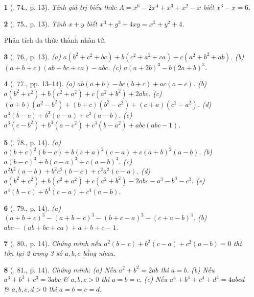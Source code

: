 \documentclass{article}
\newtheorem{baitoan}{}
\begin{document}
\begin{baitoan}[\cite{Binh_Toan_8_tap_1}, 74., p. 13]
	Tính giá trị biểu thức $A = x^6 - 2x^4 + x^3 + x^2 - x$ biết $x^3 - x = 6$.
\end{baitoan}

\begin{baitoan}[\cite{Binh_Toan_8_tap_1}, 75., p. 13]
	Tính $x + y$ biết $x^3 + y^3 + 4xy = x^2 + y^2 + 4$.
\end{baitoan}
Phân tích đa thức thành nhân tử:

\begin{baitoan}[\cite{Binh_Toan_8_tap_1}, 76., p. 13]
	(a) $a(b^2 + c^2 + bc) + b(c^2 + a^2 + ca) + c(a^2 + b^2 + ab)$. (b) $(a + b + c)(ab + bc + ca) - abc$. (c) $a(a + 2b)^3 - b(2a + b)^3$.
\end{baitoan}

\begin{baitoan}[\cite{Binh_Toan_8_tap_1}, 77., pp. 13--14]
	(a) $ab(a + b) - bc(b + c) + ac(a - c)$. (b) $a(b^2 + c^2) + b(c^2 + a^2) + c(a^2 + b^2) + 2abc$. (c) $(a + b)(a^2 - b^2) + (b + c)(b^2 - c^2) + (c + a)(c^2 - a^2)$. (d) $a^3(b - c) + b^3(c - a) + c^3(a - b)$. (e) $a^3(c - b^2) + b^3(a - c^2) + c^3(b - a^2) + abc(abc - 1)$.
\end{baitoan}

\begin{baitoan}[\cite{Binh_Toan_8_tap_1}, 78., p. 14]
	(a) $a(b + c)^2(b - c) + b(c + a)^2(c - a) + c(a + b)^2(a - b)$. (b) $a(b - c)^3 + b(c - a)^3 + c(a - b)^3$. (c) $a^2b^2(a - b) + b^2c^2(b - c) + c^2a^2(c - a)$. (d) $a(b^2 + c^2) + b(c^2 + a^2) + c(a^2 + b^2) - 2abc - a^3 - b^3 - c^3$. (e) $a^4(b - c) + b^4(c - a) + c^4(a - b)$.
\end{baitoan}

\begin{baitoan}[\cite{Binh_Toan_8_tap_1}, 79., p. 14]
	(a) $(a + b + c)^3 - (a + b - c)^3 - (b + c - a)^3 - (c + a - b)^3$. (b) $abc - (ab + bc + ca) + a + b + c - 1$.
\end{baitoan}

\begin{baitoan}[\cite{Binh_Toan_8_tap_1}, 80., p. 14]
	Chứng minh nếu $a^2(b - c) + b^2(c - a) + c^2(a - b) = 0$ thì tồn tại 2 trong 3 số $a,b,c$ bằng nhau.
\end{baitoan}

\begin{baitoan}[\cite{Binh_Toan_8_tap_1}, 81., p. 14]
	Chứng minh: (a) Nếu $a^2 + b^2 = 2ab$ thì $a = b$. (b) Nếu $a^3 + b^3 + c^3 = 3abc$ \& $a,b,c > 0$ thì $a = b = c$. (c) Nếu $a^4 + b^4 + c^4 + d^4 = 4abcd$ \& $a,b,c,d > 0$ thì $a = b = c = d$.
\end{baitoan}
\end{document}
